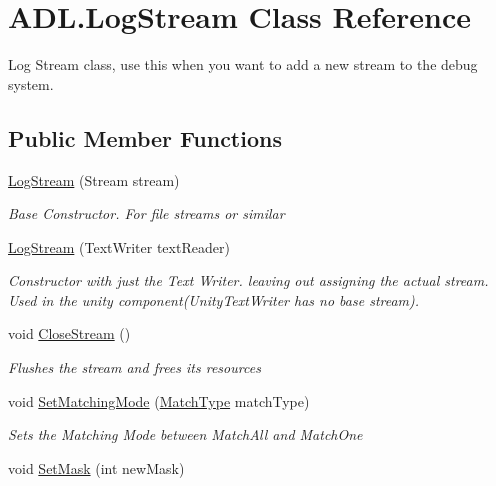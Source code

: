 \hypertarget{class_a_d_l_1_1_log_stream}{}\section{A\+D\+L.\+Log\+Stream Class Reference}
\label{class_a_d_l_1_1_log_stream}


Log Stream class, use this when you want to add a new stream to the debug system.  


\subsection*{Public Member Functions}
\begin{DoxyCompactItemize}
\item 
\mbox{\hyperlink{class_a_d_l_1_1_log_stream_a1f2e350b81d2c832024547590d918782}{Log\+Stream}} (Stream stream)
\begin{DoxyCompactList}\small\item\em Base Constructor. For file streams or similar \end{DoxyCompactList}\item 
\mbox{\hyperlink{class_a_d_l_1_1_log_stream_a7fa87cb8c69e1c56bfdbd1d09093bb49}{Log\+Stream}} (Text\+Writer text\+Reader)
\begin{DoxyCompactList}\small\item\em Constructor with just the Text Writer. leaving out assigning the actual stream. Used in the unity component(\+Unity\+Text\+Writer has no base stream). \end{DoxyCompactList}\item 
void \mbox{\hyperlink{class_a_d_l_1_1_log_stream_afd62c8127a7d8573621ac0c565ed62ac}{Close\+Stream}} ()
\begin{DoxyCompactList}\small\item\em Flushes the stream and frees its resources \end{DoxyCompactList}\item 
void \mbox{\hyperlink{class_a_d_l_1_1_log_stream_af66833a158ebb7d8e079810bb2b8f50e}{Set\+Matching\+Mode}} (\mbox{\hyperlink{namespace_a_d_l_af6334296dbae0383a652317263f0bc05}{Match\+Type}} match\+Type)
\begin{DoxyCompactList}\small\item\em Sets the Matching Mode between Match\+All and Match\+One \end{DoxyCompactList}\item 
void \mbox{\hyperlink{class_a_d_l_1_1_log_stream_a7a1a25f0247d4ebfeb5a4d6e37fe4e3a}{Set\+Mask}} (int new\+Mask)

\end{DoxyCompactItemize}
